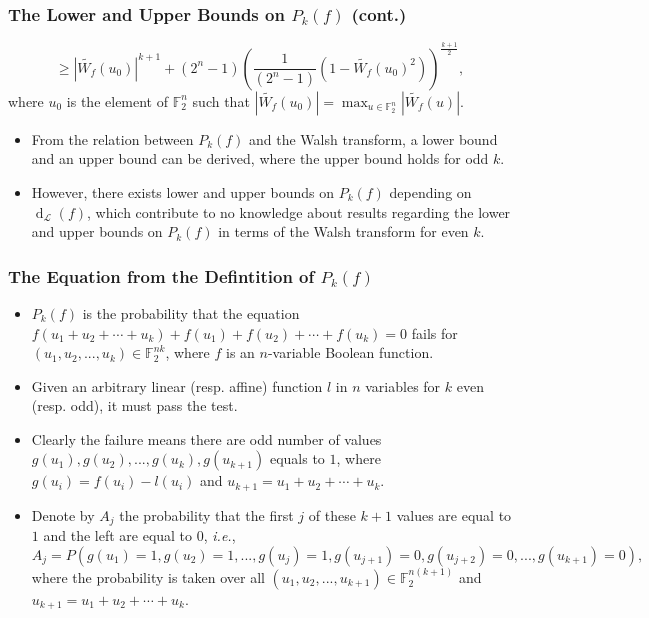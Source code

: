 \documentclass[
    aspectratio=169,                   %
]{beamer}
\newcommand{\F}{\mathbb{F}}
\newcommand{\disl}{\operatorname{d}_{\mathcal{L}}}
\begin{document}
    \begin{frame}
        \frametitle{The Lower and Upper Bounds on $P_k(f)$ (cont.)}
        \[\ge\left| \widetilde{W_f}(u_0) \right|^{k+1}+(2^n-1)\left( \frac{1}{(2^n-1)}\left( 1- \widetilde{W_f}(u_0)^2\right) \right)^{\frac{k+1}{2}},\]
        where $u_0$ is the element of $\F_2^n$ such that $|\widetilde{W_f}(u_0)|=\max_{u\in\F_2^n}|\widetilde{W_f}(u)|$.
        \begin{itemize}
            \item From the relation between $P_k(f)$ and the Walsh transform, a lower bound and an upper bound can be derived, where the upper bound holds for odd $k$.
            \item However, there exists lower and upper bounds on $P_k(f)$ depending on $\disl(f)$, which contribute to no knowledge about results regarding the lower and upper bounds on $P_k(f)$ in terms of the Walsh transform for even $k$. 
        \end{itemize}
    \end{frame}

    \begin{frame}
        \frametitle{The Equation from the Defintition of $P_k(f)$}
    
        \begin{itemize}
            \item $P_k(f)$ is the probability that the equation $f (u_1 +u_2+\cdots + u_k) + f (u_1) + f(u_2)+\cdots + f (u_k) = 0$ fails for $(u_1,u_2,...,u_k)\in\F_2^{nk}$, where $f$ is an $n$-variable Boolean function.
            \item Given an arbitrary linear (resp. affine) function $l$ in $n$ variables for $k$ even (resp. odd), it must pass the test.
            \item Clearly the failure means there are odd number of values $g(u_1),g(u_2),...,g(u_k),g(u_{k+1})$ equals to $1$, where $g(u_i)=f(u_i)-l(u_i)$ and $u_{k+1}=u_1+u_2+\cdots+u_k$. 
            \item Denote by $A_j$ the probability that the first $j$ of these $k + 1$ values are equal to $1$ and the left are equal to $0$, \emph{i.e.}, 
            \[A_j=P(g(u_1)=1,g(u_2)=1,...,g(u_j)=1,g(u_{j+1})=0,g(u_{j+2})=0,...,g(u_{k+1})=0),\]
            where the probability is taken over all $(u_1,u_2,...,u_{k+1})\in\F_2^{n(k+1)}$ and $u_{k+1}=u_1+u_2+\cdots+u_k$.
        \end{itemize}
    \end{frame}
\end{document}
